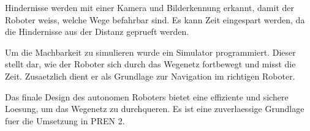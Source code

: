Hindernisse werden mit einer Kamera und Bilderkennung erkannt, damit der Roboter weiss, welche Wege befahrbar sind. Es kann Zeit eingespart werden, da die Hindernisse aus der Distanz geprueft werden.

Um die Machbarkeit zu simulieren wurde ein Simulator programmiert. Dieser stellt dar, wie der Roboter sich durch das Wegenetz fortbewegt und misst die Zeit. Zusaetzlich dient er als Grundlage zur Navigation im richtigen Roboter.

Das finale Design des autonomen Roboters bietet eine effiziente und sichere Loesung, um das Wegenetz zu durchqueren. Es ist eine zuverlaessige Grundlage fuer die Umsetzung in PREN 2.



